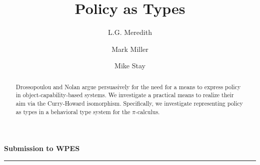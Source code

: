 \documentclass[]{amsart}
\theoremstyle{definition}
\theoremstyle{remark}
\numberwithin{equation}{subsection}
\newcommand{\pic}{$\pi$-calculus}
\newcommand{\papertitle}{Policy as Types}
\newcommand{\paperversion}{Draft Version 0.1 - July 19, 2013}
\begin{document}
\setlength{\topmargin}{0in}
\setlength{\textheight}{8.5in}
\setlength{\parskip}{6pt}

\title{\papertitle}

\author{ L.G. Meredith }
\author{ Mark Miller }
\author{ Mike Stay }







\dedicatory{}



\begin{abstract}
\normalsize{ 

  Drossopoulou and Nolan argue persuasively for the need for a means
  to express policy in object-capability-based systems. We investigate
  a practical means to realize their aim via the Curry-Howard
  isomorphism. Specifically, we investigate representing policy as
  types in a behavioral type system for the \pic.

}

\end{abstract}

\noindent
{\large \textbf{Submission to WPES}}\\
\rule{6.25in}{0.75pt}\\\\\\

\maketitle

\end{document}
